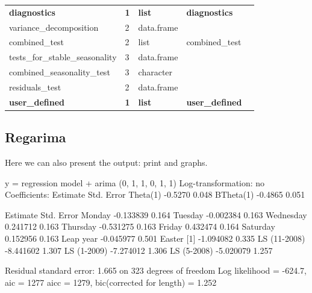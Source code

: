 \documentclass[article]{jss}
\begin{document}
\begin{longtable}[t]{lllll}
\textbf{\hspace{1em}diagnostics} & \textbf{1} & \textbf{list} & \textbf{diagnostics}\\
\addlinespace
\hspace{2em}variance\_decomposition & 2 & data.frame &  & \\
\hspace{2em}combined\_test & 2 & list & combined\_test & \\
\hspace{3em}tests\_for\_stable\_seasonality & 3 & data.frame &  & \\
\hspace{3em}combined\_seasonality\_test & 3 & character &  & \\
\hspace{2em}residuals\_test & 2 & data.frame &  & \\
\textbf{\hspace{1em}user\_defined} & \textbf{1} & \textbf{list} & \textbf{user\_defined}\\
\bottomrule
\end{longtable}\endgroup{}

\hypertarget{regarima}{%
\subsection{Regarima}\label{regarima}}

Here we can also present the output: print and graphs.

\begin{CodeChunk}


\begin{CodeOutput}
y = regression model + arima (0, 1, 1, 0, 1, 1)
Log-transformation: no
Coefficients:
          Estimate Std. Error
Theta(1)   -0.5270      0.048
BTheta(1)  -0.4865      0.051

              Estimate Std. Error
Monday       -0.133839      0.164
Tuesday      -0.002384      0.163
Wednesday     0.241712      0.163
Thursday     -0.531275      0.163
Friday        0.432474      0.164
Saturday      0.152956      0.163
Leap year    -0.045977      0.501
Easter [1]   -1.094082      0.335
LS (11-2008) -8.441602      1.307
LS (1-2009)  -7.274012      1.306
LS (5-2008)  -5.020079      1.257


Residual standard error: 1.665 on 323 degrees of freedom
Log likelihood = -624.7, aic =  1277 aicc =  1279, bic(corrected for length) = 1.252
\end{CodeOutput}
\end{CodeChunk}
\end{document}
